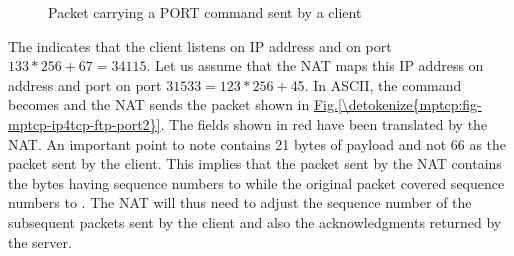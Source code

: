 \documentclass[letterpaper,10pt,english]{sphinxmanual}
\begin{document}
\begin{figure}[htbp]
\caption{Packet carrying a PORT command sent by a client}\label{\detokenize{mptcp:id80}}\label{\detokenize{mptcp:fig-mptcp-ip4tcp-ftp-port}}\end{figure}
\sphinxAtStartPar
The  indicates that the client listens on IP address  and on port \(133*256+67=34115\). Let us assume that the NAT maps this IP address on address  and port  on port \(31533=123*256+45\). In ASCII, the  command becomes  and the NAT sends the packet shown in \hyperref[\detokenize{mptcp:fig-mptcp-ip4tcp-ftp-port2}]{Fig.\@ \ref{\detokenize{mptcp:fig-mptcp-ip4tcp-ftp-port2}}}. The fields shown in red have been translated by the NAT. An important point to note contains 21 bytes of payload and not 66 as the packet sent by the client. This implies that the packet sent by the NAT contains the bytes having sequence numbers  to  while the original packet covered sequence numbers  to . The NAT will thus need to adjust the sequence number of the subsequent packets sent by the client and also the acknowledgments returned by the server.
\end{document}

